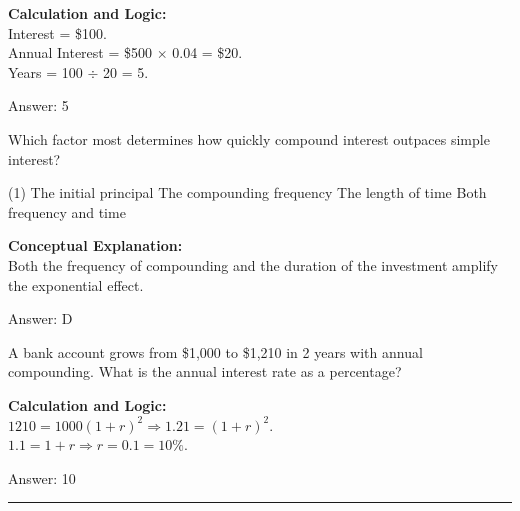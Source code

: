 \documentclass[11pt,paper=a4,answers]{exam}
\begin{document}
\begin{questions}
\begin{solution}
\textbf{Calculation and Logic:} \\
Interest = \$100. \\
Annual Interest = \$500 $\times$ 0.04 = \$20. \\
Years = 100 $\div$ 20 = 5.

\vspace{30pt}

Answer: \colorbox{yellow!100}{5}
\end{solution}

\vspace{60pt}

\question
Which factor most determines how quickly compound interest outpaces simple interest?
\begin{tasks}(1)
    \task The initial principal
    \task The compounding frequency
    \task The length of time
    \task Both frequency and time
\end{tasks}

\begin{solution}
\textbf{Conceptual Explanation:} \\
Both the frequency of compounding and the duration of the investment amplify the exponential effect.

\vspace{30pt}

Answer: \colorbox{yellow!100}{D}
\end{solution}

\vspace{60pt}

\question
A bank account grows from \$1,000 to \$1,210 in 2 years with annual compounding. What is the annual interest rate as a percentage?

\begin{solution}
\textbf{Calculation and Logic:} \\
$1210 = 1000(1+r)^2 \Rightarrow 1.21 = (1+r)^2$. \\
$1.1 = 1+r \Rightarrow r = 0.1 = 10\%$.

\vspace{30pt}

Answer: \colorbox{yellow!100}{10}
\end{solution}


\end{questions}
\begin{center}
\rule{.5\textwidth}{1pt}
\end{center}
\end{document}
